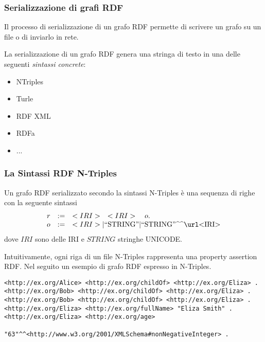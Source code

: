 \documentclass[8pt]{beamer}
\begin{document}
% 
\begin{frame}
 \frametitle{Serializzazione di grafi RDF}
 
 Il processo di serializzazione di un grafo RDF permette
 di scrivere un grafo su un file o di inviarlo in rete.
 \vspace{\baselineskip}
 
 La serializzazione di un grafo RDF genera una stringa di testo
 in una delle seguenti \emph{sintassi concrete}:
 \begin{itemize}
  \item NTriples
  \item Turle
  \item RDF XML
  \item RDFa
  \item ...
 \end{itemize}
\end{frame} 

\begin{frame}[fragile]
 \frametitle{La Sintassi RDF N-Triples}
 
 Un grafo RDF serializzato secondo la sintassi N-Triples \`e
 una sequenza di righe con la seguente sintassi
\[
\begin{array}{rcl}
 r & := & <IRI> \quad <IRI> \quad o . \\
 o & := & <IRI> | \stringLiteral{STRING} | \literal{STRING}{<IRI>}
\end{array} 
\]
dove $IRI$ sono delle IRI e $STRING$ stringhe UNICODE.
\vspace{\baselineskip}

Intuitivamente, ogni riga di un file N-Triples rappresenta 
una property assertion RDF. Nel seguito un esempio di grafo
RDF espresso in N-Triples.
\vspace{\baselineskip}


\begin{Verbatim}[fontsize=\small]
<http://ex.org/Alice> <http://ex.org/childOf> <http://ex.org/Eliza> .
<http://ex.org/Bob> <http://ex.org/childOf> <http://ex.org/Eliza> .
<http://ex.org/Bob> <http://ex.org/childOf> <http://ex.org/Eliza> .
<http://ex.org/Eliza> <http://ex.org/fullName> "Eliza Smith" .
<http://ex.org/Eliza> <http://ex.org/age> 
                        "63"^^<http://www.w3.org/2001/XMLSchema#nonNegativeInteger> .
\end{Verbatim}
\end{frame}
\end{document}

